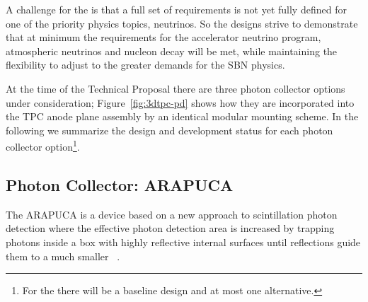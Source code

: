A challenge for the  is that a full set of requirements is not yet fully defined for one of the priority physics topics,  neutrinos. So the designs strive to demonstrate that at minimum the requirements for the accelerator neutrino program, atmospheric neutrinos and nucleon decay will be met, while maintaining the flexibility to adjust to the greater demands for the SBN physics.    
 

At the time of the Technical Proposal there are three photon collector options under consideration; Figure~\ref{fig:3dtpc-pd} shows how they are incorporated into the TPC anode plane assembly by an identical modular mounting scheme. In the following we summarize the design and development status for each photon collector option\footnote{For the  there will be a baseline design and at most one alternative.}.



\subsection{Photon Collector: ARAPUCA}
\label{ssec:fdsp-pd-pc-arapuca}

The ARAPUCA is a device based on a new approach to \lar scintillation photon detection where the effective photon detection area is increased by trapping photons inside a box with highly reflective internal surfaces until reflections guide them to a much smaller ~\cite{arapuca_jinst}. 

